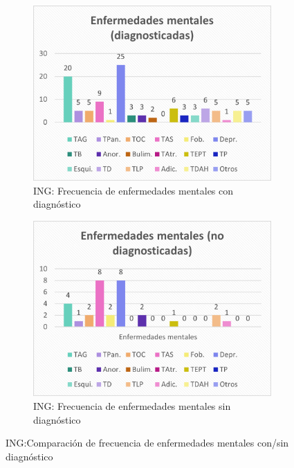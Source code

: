 \documentclass[12pt, a4paper,twoside,titlepage]{book}
\begin{document}
\begin{figure}
\centering
\begin{subfigure}{.5\textwidth}
  \centering
  \includegraphics[width=.95\linewidth]{ANEXO ING/23AnexINGEnfdiag}
  \caption{ING: Frecuencia de enfermedades mentales con diagnóstico}
\end{subfigure}%
\begin{subfigure}{.5\textwidth}
  \centering
  \includegraphics[width=.95\linewidth]{ANEXO ING/24AnexINGEnfnodiag}
  \caption{ING: Frecuencia de enfermedades mentales sin diagnóstico}
\end{subfigure}
\caption{ING:Comparación de frecuencia de enfermedades mentales con/sin diagnóstico}
\end{figure}
\end{document}
